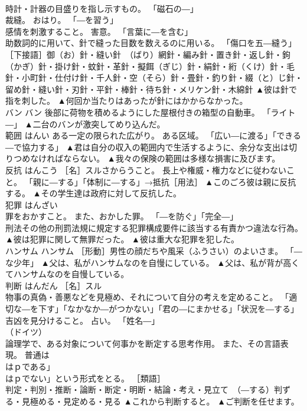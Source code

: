 \documentclass[8pt]{extreport}
\begin{document}
\begin{CJK}{UTF8}{min}
\\	時計・計器の目盛りを指し示すもの。 「磁石の―」 
\\	裁縫。 おはり。 「―を習う」 
\\	感情を刺激すること。 害意。 「言葉に―を含む」 
\\	助数詞的に用いて、針で縫った目数を数えるのに用いる。 「傷口を五―縫う」 ［下接語］御（お）針・縫い針　（ばり）網針・編み針・置き針・返し針・鉤（かぎ）針・掛け針・蚊針・革針・擬餌（ぎじ）針・絹針・絎（くけ）針・毛針・小町針・仕付け針・千人針・空（そら）針・畳針・釣り針・綴（と）じ針・留め針・縫い針・刃針・平針・棒針・待ち針・メリケン針・木綿針	▲彼は針で指を刺した。 ▲何回か当たりはあったが針にはかからなかった。
\\	バン	バン	後部に荷物を積めるようにした屋根付きの箱型の自動車。 「ライト―」	▲二台のバンが激突してめり込んだ。
\\	範囲	はんい	ある一定の限られた広がり。 ある区域。 「広い―に渡る」「できる―で協力する」	▲君は自分の収入の範囲内で生活するように、余分な支出は切りつめなければならない。 ▲我々の保険の範囲は多様な損害に及びます。
\\	反抗	はんこう	［名］スルさからうこと。 長上や権威・権力などに従わないこと。 「親に―する」「体制に―する」→抵抗［用法］	▲このごろ彼は親に反抗する。 ▲その学生達は政府に対して反抗した。
\\	犯罪	はんざい	
\\	罪をおかすこと。 また、おかした罪。 「―を防ぐ」「完全―」 
\\	刑法その他の刑罰法規に規定する犯罪構成要件に該当する有責かつ違法な行為。	▲彼は犯罪に関して無罪だった。 ▲彼は重大な犯罪を犯した。
\\	ハンサム	ハンサム	［形動］男性の顔だちや風采（ふうさい）のよいさま。 「―な少年」	▲父は、私がハンサムなのを自慢にしている。 ▲父は、私が背が高くてハンサムなのを自慢している。
\\	判断	はんだん	［名］スル 
\\	物事の真偽・善悪などを見極め、それについて自分の考えを定めること。 「適切な―を下す」「なかなか―がつかない」「君の―にまかせる」「状況を―する」 
\\	吉凶を見分けること。 占い。 「姓名―」 
\\	（ドイツ）
\\	論理学で、ある対象について何事かを断定する思考作用。 また、その言語表現。 普通は
\\	はｐである」
\\	はｐでない」という形式をとる。 ［類語］
\\	判定・判別・推断・論断・断定・明断・結論・考え・見立て　（―する）判ずる・見極める・見定める・見る	▲これから判断すると。 ▲ご判断を任せます。

\end{CJK}
\end{document}
